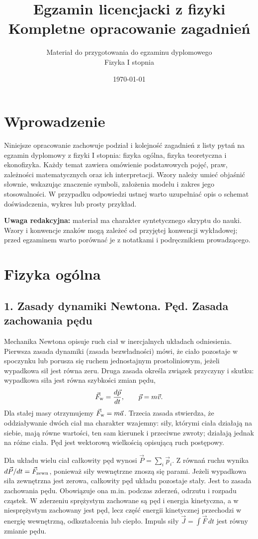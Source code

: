 \documentclass[11pt,a4paper,oneside]{report}
\title{\Huge Egzamin licencjacki z fizyki\\[0.5em]\Large Kompletne opracowanie zagadnień}
\author{Materiał do przygotowania do egzaminu dyplomowego\\Fizyka I stopnia}
\date{\today}
\begin{document}
\maketitle
\tableofcontents
\chapter*{Wprowadzenie}
Niniejsze opracowanie zachowuje podział i kolejność zagadnień z listy pytań na egzamin dyplomowy z fizyki I stopnia: fizyka ogólna, fizyka teoretyczna i ekonofizyka. Każdy temat zawiera omówienie podstawowych pojęć, praw, zależności matematycznych oraz ich interpretacji. Wzory należy umieć objaśnić słownie, wskazując znaczenie symboli, założenia modelu i zakres jego stosowalności. W przypadku odpowiedzi ustnej warto uzupełniać opis o schemat doświadczenia, wykres lub prosty przykład.
\bigskip

\noindent\textbf{Uwaga redakcyjna:} materiał ma charakter syntetycznego skryptu do nauki. Wzory i konwencje znaków mogą zależeć od przyjętej konwencji wykładowej; przed egzaminem warto porównać je z notatkami i podręcznikiem prowadzącego.

\chapter{Fizyka ogólna}
\section{1. Zasady dynamiki Newtona. Pęd. Zasada zachowania pędu}
Mechanika Newtona opisuje ruch ciał w inercjalnych układach odniesienia. Pierwsza zasada dynamiki (zasada bezwładności) mówi, że ciało pozostaje w spoczynku lub porusza się ruchem jednostajnym prostoliniowym, jeżeli wypadkowa sił jest równa zeru. Druga zasada określa związek przyczyny i skutku: wypadkowa siła jest równa szybkości zmian pędu,
\[
\vec F_{\rm w}=\frac{d\vec p}{dt},\qquad \vec p=m\vec v.
\]
Dla stałej masy otrzymujemy \(\vec F_{\rm w}=m\vec a\). Trzecia zasada stwierdza, że oddziaływanie dwóch ciał ma charakter wzajemny: siły, którymi ciała działają na siebie, mają równe wartości, ten sam kierunek i przeciwne zwroty; działają jednak na różne ciała. Pęd jest wektorową wielkością opisującą ruch postępowy.

Dla układu wielu ciał całkowity pęd wynosi \(\vec P=\sum_i\vec p_i\). Z równań ruchu wynika \(d\vec P/dt=\vec F_{\rm zewn}\), ponieważ siły wewnętrzne znoszą się parami. Jeżeli wypadkowa siła zewnętrzna jest zerowa, całkowity pęd układu pozostaje stały. Jest to zasada zachowania pędu. Obowiązuje ona m.in. podczas zderzeń, odrzutu i rozpadu cząstek. W zderzeniu sprężystym zachowane są pęd i energia kinetyczna, a w niesprężystym zachowany jest pęd, lecz część energii kinetycznej przechodzi w energię wewnętrzną, odkształcenia lub ciepło. Impuls siły \( \vec J=\int\vec F\,dt\) jest równy zmianie pędu.
\end{document}
